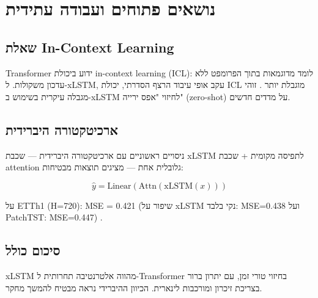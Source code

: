 
\clearpage
\chapter{נושאים פתוחים ועבודה עתידית}

\section{שאלת \textenglish{In-Context Learning}}

\textenglish{Transformer} ידוע ביכולת \textenglish{in-context learning} (\textenglish{ICL}): לומד מדוגמאות בתוך הפרומפט ללא עדכון משקולות. ל-\textenglish{xLSTM}, עקב אופי עיבוד הרצף הסדרתי, יכולת \textenglish{ICL} מוגבלת יותר \cite{brown2020language}. זוהי מגבלה עיקרית בשימוש ב-\textenglish{xLSTM} לחיזוי "אפס ירייה" (\textenglish{zero-shot}) על מדדים חדשים.

\section{ארכיטקטורה היברידית}

ניסויים ראשוניים עם ארכיטקטורה היברידית --- שכבת \textenglish{xLSTM} לתפיסה מקומית + שכבת \textenglish{attention} גלובלית אחת --- מציגים תוצאות מבטיחות:

\begin{equation}
\hat{y} = \text{Linear}\left(\text{Attn}\left(\text{xLSTM}(x)\right)\right)
\end{equation}

על \textenglish{ETTh1} (H=720): \textenglish{MSE = 0.421} (שיפור על \textenglish{xLSTM} נקי בלבד: \textenglish{MSE=0.438} ועל \textenglish{PatchTST}: \textenglish{MSE=0.447}) \cite{nie2022patchtst}.

\section{סיכום כולל}

\textenglish{xLSTM} מהווה אלטרנטיבה תחרותית ל-\textenglish{Transformer} בחיזוי טורי זמן, עם יתרון ברור בצריכת זיכרון ומורכבות לינארית. הכיוון ההיברידי נראה מבטיח להמשך מחקר.
